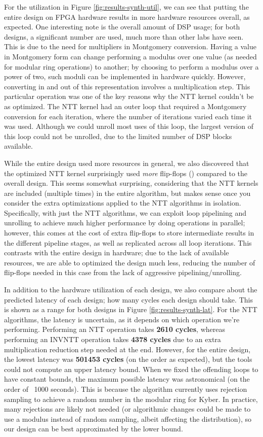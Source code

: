 For the utilization in Figure \ref{fig:results-synth-util},
we can see that putting the entire design on FPGA hardware
results in more hardware resources overall, as expected.
One interesting note is the overall amount of DSP usage; for
both designs, a significant number are used, much more than
other labs have seen. This is due to the need for multipliers
in Montgomery conversion. Having a value in Montgomery form
can change performing a modulus over one value (as needed
for modular ring operations) to another;
by choosing to perform a modulus over a power of two, such
moduli can be implemented in hardware quickly. However,
converting in and out of this representation involves a
multiplication step. This particular operation was one of
the key reasons why the NTT kernel couldn't be as
optimized. The NTT kernel had an outer loop that required
a Montgomery conversion for each iteration, where the
number of iterations varied each time it was used. Although
we could unroll most uses of this loop, the largest version
of this loop could not be unrolled, due to the limited
number of DSP blocks available.

While the entire design used more resources in general, we
also discovered that the optimized NTT kernel surprisingly
used \textit{more} flip-flops () compared to the
overall design. This seems somewhat surprising, considering
that the NTT kernels are included (multiple times) in the
entire algorithm, but makes sense once you consider the
extra optimizations applied to the NTT algorithms in
isolation. Specifically, with just the NTT algorithms, we
can exploit loop pipelining and unrolling to achieve much
higher performance by doing operations in parallel; however,
this comes at the cost of extra flip-flops to store
intermediate results in the different pipeline stages, as
well as replicated across all loop iterations. This contrasts
with the entire design in hardware; due to the lack of
available resources, we are able to optimized the design
much less, reducing the number of flip-flops needed in
this case from the lack of aggressive pipelining/unrolling.

In addition to the hardware utilization of each design, we
also compare about the predicted latency of each design;
how many cycles each design should take. This is shown as a
range for both designs in Figure \ref{fig:results-synth-lat}. For the NTT
algorithms, the latency is uncertain, as it depends on which
operation we're performing. Performing an NTT operation takes
\textbf{2610 cycles}, whereas performing an INVNTT operation takes
\textbf{4378 cycles} due to an extra multiplication reduction step needed at
the end. However, for the entire design, the lowest latency
was \textbf{501453 cycles} (on the order as expected), but the tools
could not compute an upper latency bound. When we fixed the
offending loops to have constant bounds, the maximum possible
latency was astronomical (on the order of ~1000 seconds). This
is because the algorithm currently uses rejection sampling to
achieve a random number in the modular ring for Kyber. In
practice, many rejections are likely not needed (or algorithmic
changes could be made to use a modulus instead of random
sampling, albeit affecting the distribution), so our design
can be best approximated by the lower bound.


